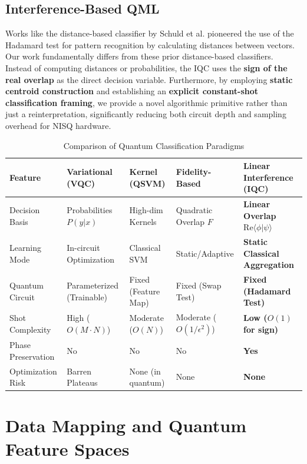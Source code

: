 \documentclass[conference]{IEEEtran}
\begin{document}
\subsection{Interference-Based QML}

Works like the distance-based classifier by Schuld et al. \cite{schuld2017distance,schuld2018book} pioneered the use of the Hadamard test for pattern recognition by calculating distances between vectors. Our work fundamentally differs from these prior distance-based classifiers. Instead of computing distances or probabilities, the IQC uses the \textbf{sign of the real overlap} as the direct decision variable. Furthermore, by employing \textbf{static centroid construction} and establishing an \textbf{explicit constant-shot classification framing}, we provide a novel algorithmic primitive rather than just a reinterpretation, significantly reducing both circuit depth and sampling overhead for NISQ hardware.

\begin{table}[t]
\centering
\caption{Comparison of Quantum Classification Paradigms}
\label{tab:comparison}
\begin{tabular}{@{}lllll@{}}
\toprule
Feature & Variational (VQC) & Kernel (QSVM) & Fidelity-Based & \textbf{Linear Interference (IQC)} \\ \midrule
Decision Basis & Probabilities $P(y|x)$ & High-dim Kernels & Quadratic Overlap $F$ & \textbf{Linear Overlap $\text{Re}\langle \phi|\psi \rangle$} \\
Learning Mode & In-circuit Optimization & Classical SVM & Static/Adaptive & \textbf{Static Classical Aggregation} \\
Quantum Circuit & Parameterized (Trainable) & Fixed (Feature Map) & Fixed (Swap Test) & \textbf{Fixed (Hadamard Test)} \\
Shot Complexity & High ($O(M \cdot N)$) & Moderate ($O(N)$) & Moderate ($O(1/\epsilon^2)$) & \textbf{Low ($O(1)$ for sign)} \\
Phase Preservation & No & No & No & \textbf{Yes} \\
Optimization Risk & Barren Plateaus & None (in quantum) & None & \textbf{None} \\ \bottomrule
\end{tabular}
\end{table}

\section{Data Mapping and Quantum Feature Spaces}
\end{document}
